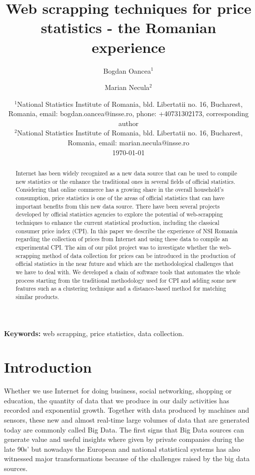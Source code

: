 \documentclass[]{article}
\title{Web scrapping techniques for price statistics -  the Romanian experience}
\author{Bogdan Oancea$^1$ \and Marian Necula$^2$}
\date{%
	$^1$National Statistics Institute of Romania, bld. Libertatii no. 16, Bucharest, Romania, email: bogdan.oancea@insse.ro, phone: +40731302173, corresponding author\\%
	$^2$National Statistics Institute of Romania, bld. Libertatii no. 16, Bucharest, Romania, email: marian.necula@insse.ro\\[2ex]%
	\today
}
\begin{document}
\maketitle

\begin{abstract}
Internet has been widely recognized as a new data source that can be used to compile new statistics or the enhance the 
traditional ones in several fields of official statistics. Considering that online commerce has a growing share in the 
overall household’s consumption, price statistics is one of the areas of official statistics that can have important 
benefits from this new data source. There have been several projects developed by official statistics agencies to explore the potential 
of web-scrapping techniques to enhance the current statistical production, including the classical consumer price index (CPI). 
In this paper we describe the experience of NSI Romania regarding the collection of prices from Internet and 
using these data to compile an experimental CPI. The aim of our pilot project was to investigate whether 
the web-scrapping method of data collection for prices can be introduced in the production of official statistics in the near future 
and which are the methodological challenges that we have to deal with.  
We developed a chain of software tools that automates the whole process starting from the traditional methodology used 
for CPI and adding some new features such as a clustering technique and a 
distance-based method for matching similar products.
\end{abstract}

{\bf Keywords:} web scrapping, price statistics, data collection.

\section{Introduction}

Whether we use Internet for doing business, social networking, shopping or education, the quantity of data that 
we produce in our daily activities has recorded and exponential growth. Together with data produced by machines and sensors, these new and 
almost real-time large volumes of data that are generated today are commonly called Big Data. The first signs that Big Data sources 
can generate value and useful insights where given by private companies during the late 90s' but nowadays the European and national 
statistical systems has also witnessed major transformations because of the challenges raised by the big data sources. 
\end{document}
